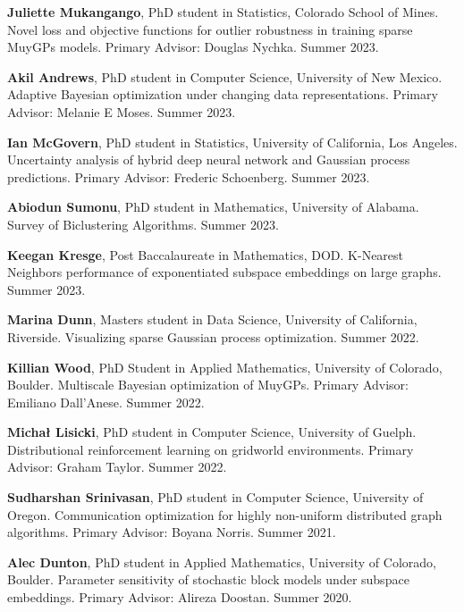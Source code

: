 \begin{innerlist}

  \item[] \textbf{Juliette Mukangango},
  PhD student in Statistics,
  Colorado School of Mines.
  Novel loss and objective functions for outlier robustness in training sparse
  MuyGPs models.
  Primary Advisor: Douglas Nychka.
  Summer 2023.

  \item[] \textbf{Akil Andrews},
  PhD student in Computer Science,
  University of New Mexico.
  Adaptive Bayesian optimization under changing data representations.
  Primary Advisor: Melanie E Moses.
  Summer 2023.

  \item[] \textbf{Ian McGovern},
  PhD student in Statistics,
  University of California, Los Angeles.
  Uncertainty analysis of hybrid deep neural network and Gaussian process
  predictions.
  Primary Advisor: Frederic Schoenberg.
  Summer 2023.

  \item[] \textbf{Abiodun Sumonu},
  PhD student in Mathematics,
  University of Alabama.
  Survey of Biclustering Algorithms.
  Summer 2023.

  \item[] \textbf{Keegan Kresge},
  Post Baccalaureate in Mathematics,
  DOD.
  K-Nearest Neighbors performance of exponentiated subspace embeddings on large
  graphs.
  Summer 2023.

  \item[] \textbf{Marina Dunn},
  Masters student in Data Science,
  University of California, Riverside.
  Visualizing sparse Gaussian process optimization.
  Summer 2022.

  \item[] \textbf{Killian Wood},
  PhD Student in Applied Mathematics,
  University of Colorado, Boulder.
  Multiscale Bayesian optimization of MuyGPs.
  Primary Advisor: Emiliano Dall'Anese.
  Summer 2022.

  \item[] \textbf{Micha{\l}
    Lisicki},
  PhD student in Computer Science,
  University of Guelph.
  Distributional reinforcement learning on gridworld environments.
  Primary Advisor: Graham Taylor.
  Summer 2022.

  \item[] \textbf{Sudharshan Srinivasan},
  PhD student in Computer Science,
  University of Oregon.
  Communication optimization for highly non-uniform distributed graph algorithms.
  Primary Advisor: Boyana Norris.
  Summer 2021.

  \item[] \textbf{Alec Dunton},
  PhD student in Applied Mathematics,
  University of Colorado, Boulder.
  Parameter sensitivity of stochastic block models under subspace embeddings.
  Primary Advisor: Alireza Doostan.
  Summer 2020.

\end{innerlist}
